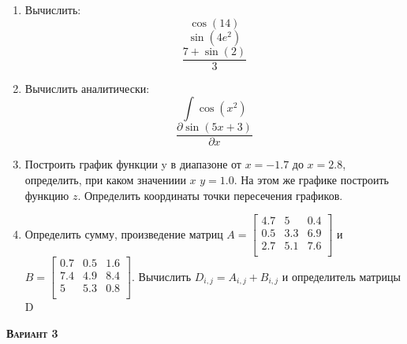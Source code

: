 \begin{enumerate}
\item Вычислить: 
\begin{equation*}\cos(14)                          \end{equation*}
\begin{equation*}\sin(4 e^2)                       \end{equation*}
\begin{equation*}\dfrac{7+\sin(2)}{3}              \end{equation*}

\item Вычислить аналитически: 
 \begin{equation*} \int \cos(x^2)          \end{equation*}\begin{equation*} {\dfrac{\partial \sin(5 x +3)}{\partial x}} \end{equation*}
\item Построить график функции y в диапазоне от $x=-1.7$ до $x=2.8$, определить, при каком значениии $x$ $y=1.0$. На этом же графике построить функцию $z $. Определить координаты точки пересечения графиков. \item Определить сумму, произведение матриц $A=\begin{bmatrix}
4.7 &5 &0.4 \\
0.5 &3.3 &6.9 \\
2.7 &5.1 &7.6 \\
\end{bmatrix}
$ и $B=\begin{bmatrix}
0.7 &0.5 &1.6 \\
7.4 &4.9 &8.4 \\
5 &5.3 &0.8 \\
\end{bmatrix}
$. Вычислить $D_{i,j}=A_{i,j} + B_{i,j}$ и определитель матрицы D
\end{enumerate}
\textsc{\textbf{Вариант 3}}


